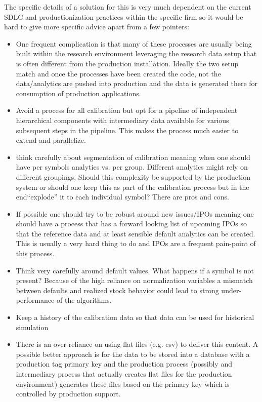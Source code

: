 The specific details of a solution for this is very much dependent on the current SDLC and productionization practices within the specific firm so it would be hard to give more specific advice apart from a few pointers:
\begin{itemize}
\item One frequent complication is that many of these processes are usually being built within the research environment leveraging the research data setup that is often different from the production installation. Ideally the two setup match and once the processes have been created the code, not the data/analytics are pushed into production and the data is generated there for consumption of production applications.
\item Avoid a  process for all calibration but opt for a pipeline of independent hierarchical components with intermediary data available for various subsequent steps in the pipeline. This makes the process much easier to extend and parallelize. 
\item think carefully about segmentation of calibration meaning when one should have per symbols analytics vs. per group. Different analytics might rely on different groupings. Should this complexity be supported by the production system or should one keep this as part of the calibration process but in the end``explode'' it to each individual symbol? There are pros and cons.
\item If possible one should try to be robust around new issues/IPOs meaning one should have a process that has a forward looking list of upcoming IPOs so that the reference data and at least sensible default analytics can be created. This is usually a very hard thing to do and IPOs are a frequent pain-point of this process.
\item Think very carefully around default values. What happens if a symbol is not present? Because of the high reliance on normalization variables a mismatch between defaults and realized stock behavior could lead to strong under-performance of the algorithms.
\item Keep a history of the calibration data so that data can be used for historical simulation
\item There is an over-reliance on using flat files (e.g. csv) to deliver this content. A possible better approach is for the data to be stored into a database with a production tag primary key and the production process (possibly and intermediary process that actually creates flat files for the production environment) generates these files based on the primary key which is controlled by production support. 
\end{itemize}

